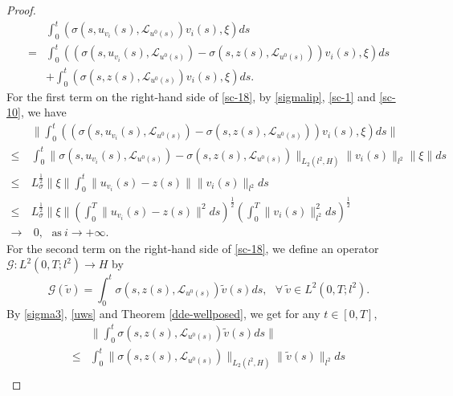 \documentclass[11pt]{article}
\numberwithin{equation}{section}
\theoremstyle{plain}
\def\leq{\leqslant}
\begin{document}
\begin{proof}
\begin{align}
        & \int_0^t \left( \sigma(s, u_{v_i}(s), \mathcal{L}_{u^0(s)} ) v_i(s), \xi \right) ds \nonumber \\
        = & \int_0^t
        \left(
        \left( \sigma(s, u_{v_i}(s), \mathcal{L}_{u^0(s)} ) - \sigma(s, z(s), \mathcal{L}_{u^0(s)} )
        \right) v_i(s),
        \xi
        \right) ds
        \nonumber \\
        & + \int_0^t
        \left( \sigma(s, z(s), \mathcal{L}_{u^0(s)} ) v_i(s), \xi \right) ds.
    \end{align}
    For the first term on the right-hand side of \eqref{sc-18},
    by \eqref{sigmalip}, \eqref{sc-1} and \eqref{sc-10},  we have
    \begin{align} \label{sc-19}
        & \| \int_0^t
        \left(
        \left( \sigma(s, u_{v_i}(s), \mathcal{L}_{u^0(s)} ) - \sigma(s, z(s), \mathcal{L}_{u^0(s)} )
        \right) v_i(s),
        \xi
        \right) ds
        \|
        \nonumber \\
        \leq & \int_0^t
        \| \sigma(s, u_{v_i}(s), \mathcal{L}_{u^0(s)} ) - \sigma(s, z(s), \mathcal{L}_{u^0(s)} ) \|_{L_2(l^2, H)}
        \| v_i(s) \|_{l^2}
        \|\xi\|
        ds
        \nonumber \\
        \leq & L_\sigma^{\frac{1}{2}}  \|\xi\|
        \int_0^t
        \| u_{v_i}(s) - z(s) \|
        \| v_i(s) \|_{l^2}
        ds
        \nonumber \\
        \leq & L_\sigma^{\frac{1}{2}}  \|\xi\|
        \left( \int_0^T
        \| u_{v_i}(s) - z(s) \|^2
        ds
        \right)^{\frac{1}{2}}
        \left( \int_0^T \| v_i(s) \|_{l^2}^2 ds
        \right)^{\frac{1}{2}}
        \nonumber \\
        \rightarrow & \  0, \ \ \  \text{as} \  i \to +\infty.
    \end{align}
    For the second term on the right-hand side of \eqref{sc-18},
    we define an operator $\mathcal{G}: L^2(0,T; l^2)  \rightarrow  H$ by
    $$\mathcal{G}(\tilde{v})
    = \int_0^t  \sigma(s, z(s), \mathcal{L}_{u^0(s)} ) \tilde{v}(s) ds, \ \ \
    \forall \  \tilde{v} \in L^2(0,T; l^2).
    $$
    By \eqref{sigma3}, \eqref{uws} and Theorem \ref{dde-wellposed},
    we get for any $t \in [0,T]$,
    \begin{align} \label{sc-20}
        & \| \int_0^t  \sigma(s, z(s), \mathcal{L}_{u^0(s)} ) \tilde{v}(s) ds \|  \nonumber \\
        \leq & \int_0^t \| \sigma(s, z(s), \mathcal{L}_{u^0(s)} ) \|_{L_2(l^2, H)}
        \| \tilde{v}(s) \|_{l^2}
        ds  \nonumber \\

\end{align}
\end{proof}
\end{document}
